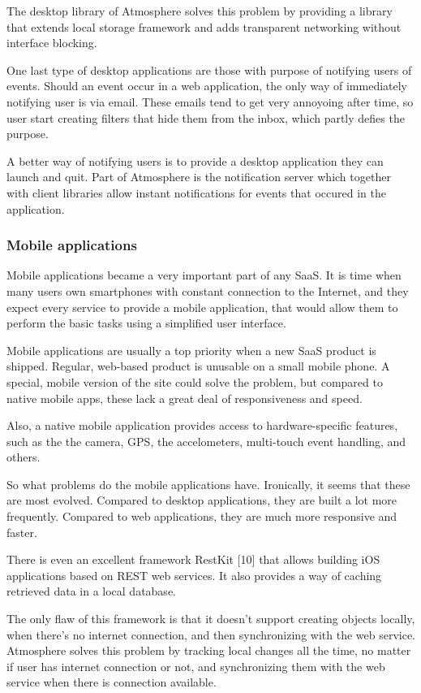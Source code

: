 The desktop library of Atmosphere solves this problem by providing a library that extends local storage framework and adds transparent networking without interface blocking. 

One last type of desktop applications are those with purpose of notifying users of events. Should an event occur in a web application, the only way of immediately notifying user is via email. These emails tend to get very annoyoing after time, so user start creating filters that hide them from the inbox, which partly defies the purpose.

A better way of notifying users is to provide a desktop application they can launch and quit. Part of Atmosphere is the notification server which together with client libraries allow instant notifications for events that occured in the application. 

\subsubsection{Mobile applications}

Mobile applications became a very important part of any SaaS. It is time when many users own smartphones with constant connection to the Internet, and they expect every service to provide a mobile application, that would allow them to perform the basic  tasks using a simplified user interface. 

Mobile applications are usually a top priority when a new SaaS product is shipped. Regular, web-based product is unusable on a small mobile phone. A special, mobile version of the site could solve the problem, but compared to native mobile apps, these lack a great deal of responsiveness and speed.

Also, a native mobile application provides access to hardware-specific features, such as the the camera, GPS, the accelometers, multi-touch event handling, and others. 

So what problems do the mobile applications have. Ironically, it seems that these are most evolved. Compared to desktop applications, they are built a lot more frequently. Compared to web applications, they are much more responsive and faster. 

There is even an excellent framework RestKit [10] that allows building iOS applications based on REST web services. It also provides a way of caching retrieved data in a local database.

The only flaw of this framework is that it doesn’t support creating objects locally, when there’s no internet connection, and then synchronizing with the web service. Atmosphere solves this problem by tracking local changes all the time, no matter if user has internet connection or not, and synchronizing them with the web service when there is connection available.

